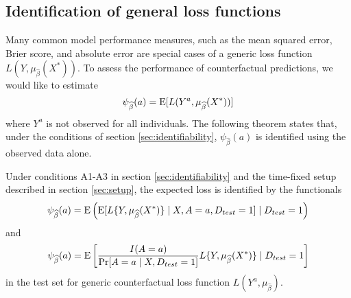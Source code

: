     \subsection{Identification of general loss functions}\label{sec:tf_proof}
    Many common model performance measures, such as the mean squared error, Brier score, and absolute error are special cases of a generic loss function $L(Y, \mu_{\widehat{\beta}}(X^*))$. To assess the performance of counterfactual predictions, we would like to estimate 
    $$\psi_{\widehat{\beta}}(a) = \operatorname{E}[L(Y^a, \mu_{\widehat{\beta}}(X^*))]$$
    where $Y^a$ is not observed for all individuals. The following theorem states that, under the conditions of section \ref{sec:identifiability}, $\psi_{\widehat{\beta}}(a)$ is identified using the observed data alone. 
    \begin{theorem}
        Under conditions A1-A3 in section \ref{sec:identifiability} and the time-fixed setup described in section \ref{sec:setup}, the expected loss is identified by the functionals
        \begin{equation}\label{eqn:app_cl_estimand}
            \psi_{\widehat{\beta}}(a) = \operatorname{E}\left(\operatorname{E}[L\{Y, \mu_{\widehat{\beta}}(X^*)\} \mid X, A=a, D_{test} = 1] \mid D_{test} = 1\right)
        \end{equation}
        and 
        \begin{equation}\label{eqn:app_ipw_estimand}
            \psi_{\widehat{\beta}}(a) = \operatorname{E}\left[\frac{I(A = a)}{\Pr[A = a \mid X, D_{test} = 1]}L\{Y, \mu_{\widehat{\beta}}(X^*)\} \mid D_{test} = 1\right]
        \end{equation}
        in the test set for generic counterfactual loss function $L(Y^{a}, \mu_{\widehat{\beta}})$.
    \end{theorem}
    

